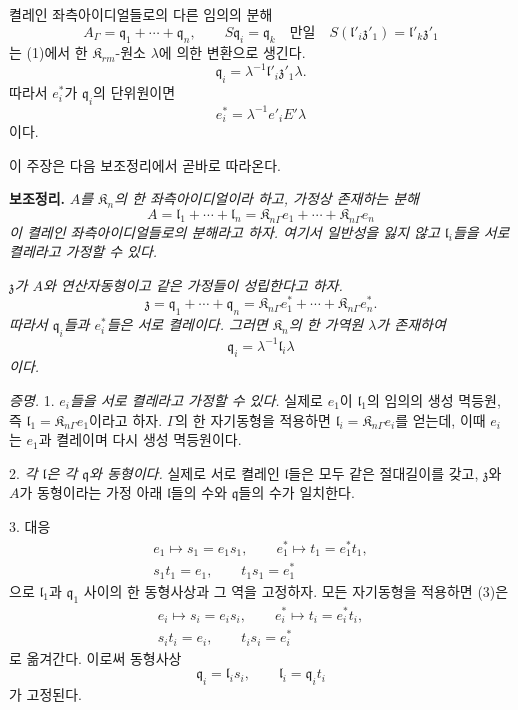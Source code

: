 켤레인 좌측아이디얼들로의 다른 임의의 분해
\[
\tag{2}
        A_\Gamma=\mathfrak q_1+\cdots+\mathfrak q_n,
        \qquad
        S\mathfrak q_i=\mathfrak q_k
        \quad\text{만일}\quad
        S(\mathfrak l'_i\mathfrak z'_1)
        =\mathfrak l'_k\mathfrak z'_1
\]
는 (1)에서 한 \(\mathfrak K_{rm}\)-원소 \(\lambda\)에 의한 변환으로 생긴다.
\[
        \mathfrak q_i
        =\lambda^{-1}\mathfrak l'_i\mathfrak z'_1\lambda.
\]
따라서 \(e_i^*\)가 \(\mathfrak q_i\)의 단위원이면
\[
        e_i^*=\lambda^{-1}e'_iE'\lambda
\]
이다.

이 주장은 다음 보조정리에서 곧바로 따라온다.

\textbf{보조정리.} \emph{\(A\)를 \(\mathfrak K_n\)의 한 좌측아이디얼이라 하고, 가정상 존재하는 분해}
\[
        A
        =\mathfrak l_1+\cdots+\mathfrak l_n
        =\mathfrak K_{n\Gamma}e_1+
         \cdots+
         \mathfrak K_{n\Gamma}e_n
\]
\emph{이 켤레인 좌측아이디얼들로의 분해라고 하자. 여기서 일반성을 잃지 않고 \(\mathfrak l_i\)들을 서로 켤레라고 가정할 수 있다.}

\emph{\(\mathfrak z\)가 \(A\)와 연산자동형이고 같은 가정들이 성립한다고 하자.}
\[
        \mathfrak z
        =\mathfrak q_1+\cdots+\mathfrak q_n
        =\mathfrak K_{n\Gamma}e_1^*+
         \cdots+
         \mathfrak K_{n\Gamma}e_n^*.
\]
\emph{따라서 \(\mathfrak q_i\)들과 \(e_i^*\)들은 서로 켤레이다. 그러면 \(\mathfrak K_n\)의 한 가역원 \(\lambda\)가 존재하여}
\[
        \mathfrak q_i=\lambda^{-1}\mathfrak l_i\lambda
\]
\emph{이다.}

\emph{증명.} 1. \emph{\(e_i\)들을 서로 켤레라고 가정할 수 있다.} 실제로 \(e_1\)이 \(\mathfrak l_1\)의 임의의 생성 멱등원, 즉 \(\mathfrak l_1=\mathfrak K_{n\Gamma}e_1\)이라고 하자. \(\Gamma\)의 한 자기동형을 적용하면 \(\mathfrak l_i=\mathfrak K_{n\Gamma}e_i\)를 얻는데, 이때 \(e_i\)는 \(e_1\)과 켤레이며 다시 생성 멱등원이다.

2. \emph{각 \(\mathfrak l\)은 각 \(\mathfrak q\)와 동형이다.} 실제로 서로 켤레인 \(\mathfrak l\)들은 모두 같은 절대길이를 갖고, \(\mathfrak z\)와 \(A\)가 동형이라는 가정 아래 \(\mathfrak l\)들의 수와 \(\mathfrak q\)들의 수가 일치한다.

3. 대응
\[
\tag{3}
\begin{gathered}
e_1\longmapsto s_1=e_1s_1,
\qquad
e_1^*\longmapsto t_1=e_1^*t_1,\\
s_1t_1=e_1,
\qquad
t_1s_1=e_1^*
\end{gathered}
\]
으로 \(\mathfrak l_1\)과 \(\mathfrak q_1\) 사이의 한 동형사상과 그 역을 고정하자. 모든 자기동형을 적용하면 (3)은
\[
\begin{gathered}
e_i\longmapsto s_i=e_is_i,
\qquad
e_i^*\longmapsto t_i=e_i^*t_i,\\
s_it_i=e_i,
\qquad
t_is_i=e_i^*
\end{gathered}
\]
로 옮겨간다. 이로써 동형사상
\[
        \mathfrak q_i=\mathfrak l_is_i,
        \qquad
        \mathfrak l_i=\mathfrak q_it_i
\]
가 고정된다.

